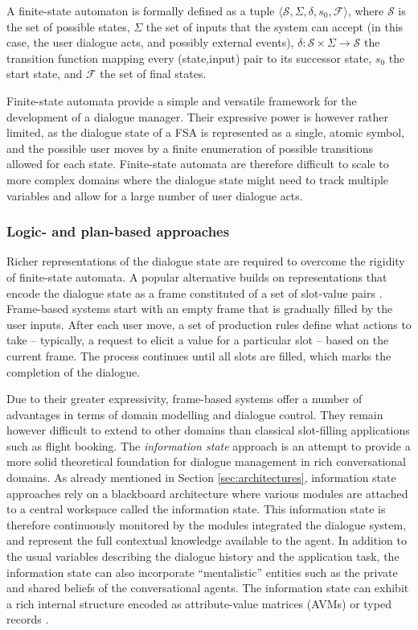 A finite-state automaton is formally defined as a tuple $\langle \mathcal{S}, \Sigma, \delta, s_0, \mathcal{F} \rangle$, where $\mathcal{S}$ is the set of possible states, $\Sigma$ the set of inputs that the system can accept (in this case, the user dialogue acts, and possibly external events),  $\delta: \mathcal{S} \times \Sigma \rightarrow \mathcal{S}$ the transition function mapping every (state,input) pair to its successor state, $s_0$ the start state, and $\mathcal{F}$ the set of final states. 

Finite-state automata provide a simple and versatile framework for the development of a dialogue manager. Their expressive power is however rather limited, as the dialogue state of a FSA is represented as a single, atomic symbol, and the possible user moves by a finite enumeration of possible transitions allowed for each state.  Finite-state automata are therefore difficult to scale to more complex domains where the dialogue state might need to track multiple variables and allow for a large number of user dialogue acts.  

\subsubsection*{Logic- and plan-based approaches}

Richer representations of the dialogue state are required to overcome the rigidity of finite-state automata. A popular alternative builds on representations that encode the dialogue state as a frame constituted of a set of slot-value pairs \citep{seneff2000}.  Frame-based systems start with an empty frame that is gradually filled by the user inputs.  After each user move, a set of production rules define what actions to take  -- typically, a request to elicit a value for a particular slot -- based on the current frame.  The process continues until all slots are filled, which marks the completion of the dialogue. 

Due to their greater expressivity, frame-based systems offer a number of advantages in terms of domain modelling and dialogue control.  They remain however difficult to extend to other domains than classical slot-filling applications such as flight booking.  The \textit{information state} approach \citep{Larsson:2000} is an attempt to provide a more solid theoretical foundation for dialogue management in rich conversational domains.  As already mentioned in Section \ref{sec:architectures}, information state approaches rely on a blackboard architecture where various modules are attached to a central workspace called the information state. This information state is therefore continuously monitored by the modules integrated the dialogue system, and represent the full contextual knowledge available to the agent. In addition to the usual variables describing the dialogue history and the application task, the information state can also incorporate ``mentalistic'' entities such as the private and shared beliefs of the conversational agents.  The information state can exhibit a rich internal structure encoded as attribute-value matrices (AVMs) or typed records  \citep{RobinCooper2012}. 

